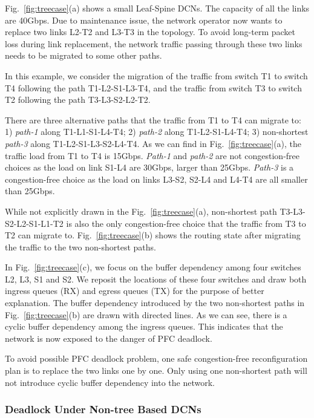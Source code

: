 Fig.~\ref{fig:treecase}(a) shows a small Leaf-Spine DCNs. The capacity of all the links are 40Gbps. Due to maintenance issue, the network operator now wants to replace two links L2-T2 and L3-T3 in the topology. To avoid long-term packet loss during link replacement, the network traffic passing through these two links needs to be migrated to some other paths. 

In this example, we consider the migration of the traffic from switch T1 to switch T4 following the path T1-L2-S1-L3-T4, and the traffic from switch T3 to switch T2 following the path T3-L3-S2-L2-T2. 

There are three alternative paths that the traffic from T1 to T4 can migrate to: 1) \textit{path-1} along T1-L1-S1-L4-T4; 2) \textit{path-2} along T1-L2-S1-L4-T4; 3) non-shortest \textit{path-3} along T1-L2-S1-L3-S2-L4-T4. As we can find in Fig.~\ref{fig:treecase}(a), the traffic load from T1 to T4 is 15Gbps. \textit{Path-1} and \textit{path-2} are not congestion-free choices as the load on link S1-L4 are 30Gbps, larger than 25Gbps. \textit{Path-3} is a congestion-free choice as the load on links L3-S2, S2-L4 and L4-T4 are all smaller than 25Gbps. 

While not explicitly drawn in the Fig.~\ref{fig:treecase}(a), non-shortest path T3-L3-S2-L2-S1-L1-T2 is also the only congestion-free choice that the traffic from T3 to T2 can migrate to. Fig.~\ref{fig:treecase}(b) shows the routing state after migrating the traffic to the two non-shortest paths. 

In Fig.~\ref{fig:treecase}(c), we focus on the buffer dependency among four switches L2, L3, S1 and S2. We reposit the locations of these four switches and draw both ingress queues (RX) and egress queues (TX) for the purpose of better explanation. The buffer dependency introduced by the two non-shortest paths in Fig.~\ref{fig:treecase}(b) are drawn with directed lines. As we can see, there is a cyclic buffer dependency among the ingress queues. This indicates that the network is now exposed to the danger of PFC deadlock.

To avoid possible PFC deadlock problem, one safe congestion-free reconfiguration plan is to replace the two links one by one. Only using one non-shortest path will not introduce cyclic buffer dependency into the network.



\subsubsection{Deadlock Under Non-tree Based DCNs}\label{subsubsec:nontreecase}



